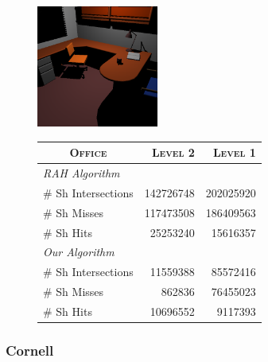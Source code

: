 \begin{figure}[!htb]
    \begin{minipage}{0.25\linewidth}
        \centering
        \includegraphics[width=4.0cm]{Images/Office_Preview}
    \end{minipage}
    \begin{minipage}{0.725\linewidth}
        \centering
        \fontsize{8}{10}
        \selectfont
        \begin{tabular}[h]{l|rr}
            \multicolumn{1}{c|}{\textsc{Office}} & \textsc{Level 2} & \textsc{Level 1}\\
            \hline
            \emph{RAH Algorithm} & & \\
            \hline
            \quad \# Sh Intersections  & 142726748  & 202025920 \\
            \quad \# Sh Misses            & 117473508  & 186409563 \\
            \quad \# Sh Hits              & 25253240   & 15616357  \\
            \hline
            \emph{Our Algorithm} & & \\
            \hline
            \quad \# Sh Intersections  & 11559388   & 85572416	\\
            \quad \# Sh Misses         & 862836     & 76455023  \\
            \quad \# Sh Hits           & 10696552   & 9117393   \\
        \end{tabular}
        \label{table:office-d8-n2-results}
    \end{minipage}
\end{figure}

\subsubsection{Cornell}

